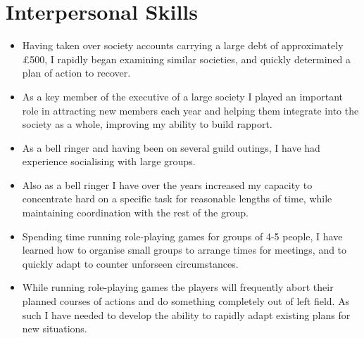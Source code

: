 \documentclass[print, oneside]{friggeri-cv} %
\begin{document}


\section{Interpersonal Skills}

\begin{itemize}
\item  Having taken over society accounts carrying a large debt of approximately \pounds 500, I rapidly began examining similar societies, and quickly determined a plan of action to recover.
\item As a key member of the executive of a large society I played an important role in attracting new members each year and helping them integrate into the society as a whole, improving my ability to build rapport.
\item As a bell ringer and having been on several guild outings, I have had experience socialising with large groups.
\item Also as a bell ringer I have over the years increased my capacity to concentrate hard on a specific task for reasonable lengths of time, while maintaining coordination with the rest of the group.
\item Spending time running role-playing games for groups of 4-5 people, I have learned how to organise small groups to arrange times for meetings, and to quickly adapt to counter unforseen circumstances.
\item While running role-playing games the players will frequently abort their planned courses of actions and do something completely out of left field. As such I have needed to develop the ability to rapidly adapt existing plans for new situations.
\end{itemize}
\end{document}
